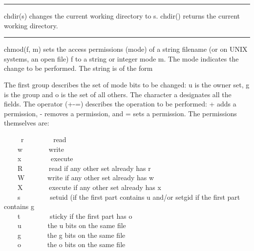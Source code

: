 \bigskip\hrule\vspace{0.1cm}

\noindent
{}\textsf{chdir(s)} changes the current
working directory to \textsf{s}. \textsf{chdir()} returns the current
working directory.

\bigskip\hrule\vspace{0.1cm}

\noindent
{}\textsf{chmod(f,
m)} sets the access permissions ({\textquotedbl}mode{\textquotedbl}) of
a string filename (or on UNIX systems, an open file) \textsf{f} to a
string or integer mode \textsf{m}. The mode indicates the change to be
performed. The string is of the form

\iconcode{
\>   [ugoa]*[+-=][rwxRWXstugo]* }

The first group describes the set of mode bits to be changed: \textsf{u}
is the owner set, \textsf{g} is the group and \textsf{o} is the set of
all others. The character \textsf{a} designates all the fields. The
operator (\textsf{+-=}) describes the operation to be performed:
\textsf{+} adds a permission, \textsf{{}-} removes a permission, and
\textsf{=} sets a permission. The permissions themselves are: 

\ \ \ \ \ \textsf{r} \ \ \ \ \ \ \ \ read\\
 \ \ \ \ \textsf{w} \ \ \ \ \ \ \ write\\
 \ \ \ \ \textsf{x} \ \ \ \ \ \ \ \ execute\\
 \ \ \ \ \textsf{R} \ \ \ \ \ \ \ read if any other set already has
r\\
 \ \ \ \ \textsf{W} \ \ \ \ \ \ write if any other set already has
w\\
 \ \ \ \ \textsf{X} \ \ \ \ \ \ \ execute if any other set already has
x\\
 \ \ \ \ \textsf{s} \ \ \ \ \ \ \ \ setuid (if the first part contains u
and/or setgid if the first part contains g\\
 \ \ \ \ \textsf{t} \ \ \ \ \ \ \ \ sticky if the first part has
o\\
 \ \ \ \ \textsf{u} \ \ \ \ \ \ \ the u bits on the same file\\
 \ \ \ \ \textsf{g} \ \ \ \ \ \ \ the g bits on the same file\\
 \ \ \ \ \textsf{o} \ \ \ \ \ \ \ the o bits on the same file

